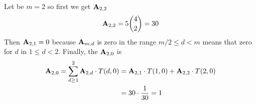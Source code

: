 \begin{examp}
    Let be $m=2$ so first we get ${\mathbf{A}} \sb{2,2}$
    \begin{equation*}
        {\mathbf{A}} \sb{2,2} = 5\binom{4}{2}=30
    \end{equation*}
    Then ${\mathbf{A}} \sb{2,1} = 0$ because ${\mathbf{A}} \sb{m,d}$ is zero in the range $m/2 \leq d < m$ means that zero for $d$ in
    $1 \leq d < 2$.
    Finally, the ${\mathbf{A}} \sb{2,0}$ is
    \begin{equation*}
        \begin{split}
            {\mathbf{A}} \sb{2,0}
            = \sum_{d \geq 1}^{2} {\mathbf{A}} \sb{2,d} \cdot T(d, 0)
            &= {\mathbf{A}} \sb{2,1} \cdot T(1, 0) + {\mathbf{A}} \sb{2,2} \cdot T(2, 0) \\
            &= 30 \cdot \frac{1}{30} = 1
        \end{split}
    \end{equation*}
\end{examp}